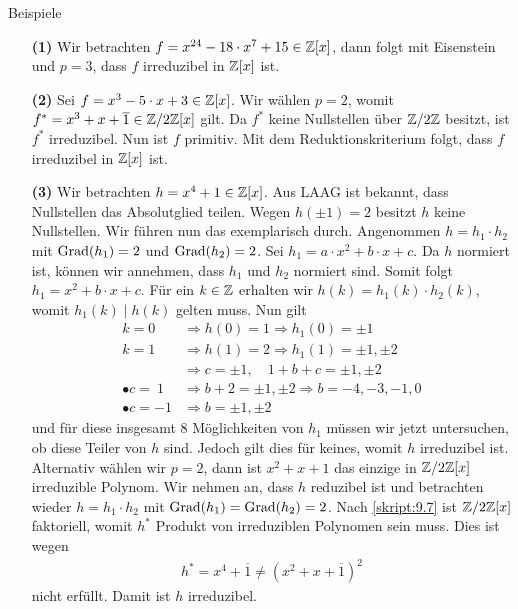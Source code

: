 \begin{genericdf}{Beispiele}\label{skript:10.5}\
	\begin{enumerate}
		\item[\textbf{(1)}]
		Wir betrachten $ f = x^{24} - 18 \cdot x^{7} + 15 \in \mathbb{Z}[x] $,
		dann folgt mit Eisenstein und $ p =3 $, dass $ f $ irreduzibel in $ \mathbb{Z}[x] $ ist.
		
		\item[\textbf{(2)}]
		Sei $ f = x^3-5 \cdot x + 3 \in \mathbb{Z}[x] $.
		Wir wählen $ p = 2 $, womit
		$ f^\ast = x^3 + x + \overline{1}  \in \mathbb{Z} / 2 \mathbb{Z}[x]$ gilt.
		Da $ f^\ast $ keine Nullstellen über $ \mathbb{Z} / 2 \mathbb{Z} $ besitzt, ist $ f^\ast $ irreduzibel.
		Nun ist $ f $ primitiv. 
		Mit dem Reduktionskriterium folgt, dass $ f $ irreduzibel in $ \mathbb{Z}[x] $ ist.
		
		\item[\textbf{(3)}]
		Wir betrachten $ h = x^4 + 1 \in \mathbb{Z}[x]$.
		Aus LAAG ist bekannt, dass Nullstellen das Absolutglied teilen.
		Wegen $ h(\pm 1) = 2 $ besitzt $ h $ keine Nullstellen.
		Wir führen nun das  exemplarisch durch.
		Angenommen $ h = h_1 \cdot h_2 $ mit $ \operatorname{Grad}(h_1) = 2  $ und $ \operatorname{Grad}(h_2) = 2 $.
		Sei $ h_1 = a \cdot x^2 + b \cdot x + c$.
		Da $ h $ normiert ist, können wir annehmen, dass $ h_1 $ und $ h_2 $ normiert sind.
		Somit folgt $ h_1 = x^2 + b \cdot x + c $.
		Für ein $ k \in \mathbb{Z} $ erhalten wir $ h(k) = h_1(k) \cdot h_2(k) $, womit $ h_1(k) \mid h(k) $ gelten muss. Nun gilt
		\begin{align*}
		k = 0 		  &\Rightarrow h(0) = 1 \Rightarrow h_1(0) = \pm 1 \\
		k = 1 		  &\Rightarrow h(1) = 2 \Rightarrow h_1(1) = \pm 1, \pm 2\\
					  &\Rightarrow c = \pm 1, \quad 1 + b + c = \pm 1 , \pm 2\\
		\bullet c = \ 1 &\Rightarrow b + 2 = \pm 1 , \pm 2 \Rightarrow b = -4,-3,-1, 0\\
		\bullet c =-1 &\Rightarrow b = \pm 1 , \pm 2 
		\end{align*}
		und für diese insgesamt 8 Möglichkeiten von $ h_1 $ müssen wir jetzt untersuchen, 
		ob diese Teiler von $ h $ sind.
		Jedoch gilt dies für keines, womit $ h $ irreduzibel ist.
		Alternativ wählen wir $ p = 2 $, dann ist $ x^2 + x + 1$ das einzige in $ \mathbb{Z} / 2 \mathbb{Z}[x] $ irreduzible
		Polynom.
		Wir nehmen an, dass $ h $ reduzibel ist und betrachten wieder $ h = h_1 \cdot h_2 $
		mit $ \operatorname{Grad}(h_1) = \operatorname{Grad}(h_2) = 2 $. Nach \ref{skript:9.7} ist $ \mathbb{Z} / 2 \mathbb{Z}[x] $ faktoriell, womit 
		$ h^\ast $ Produkt von irreduziblen Polynomen sein muss.
		Dies ist wegen
		\begin{align*}
		h^\ast = x^4 + \overline{1} \neq (x^2  + x + \overline{1})^2
		\end{align*}
		nicht erfüllt. Damit ist $ h$ irreduzibel.
		

\end{enumerate}
\end{genericdf}
